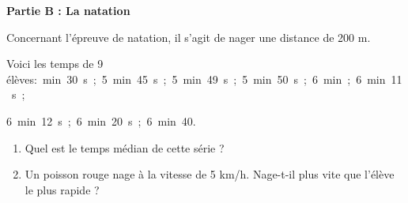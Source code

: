\documentclass[exercice,a4]{thedocument}%
\begin{document}
\textbf{Partie B : La natation}

Concernant l'épreuve de natation, il s'agit de nager une distance de 200 m.

Voici les temps de 9 élèves:~min~30~s~;~5~min~45~s~;~5~min~49~s~;~5~min~50~s~;~6~min~;~6~min~11~s~;

6~min~12~s~;~6~min~20~s~;~6~min~40.

\begin{enumerate}
    \item Quel est le temps médian de cette série ?
    \item Un poisson rouge nage à la vitesse de 5 km/h.
    Nage-t-il plus vite que l'élève le plus rapide ?
\end{enumerate}
\showthesource
\end{document}
